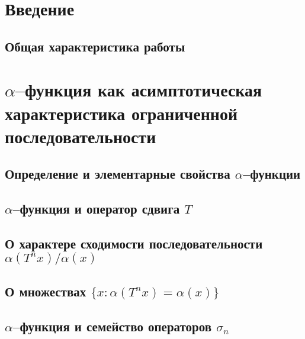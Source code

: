 \documentclass[12pt,a4paper,openbib]{report}
\theoremstyle{definition}
\begin{document}

\setcounter{page}{2}
\tableofcontents

\chapter*{Введение}

\section*{Общая характеристика работы}





\chapter{$\alpha$--функция как асимптотическая характеристика ограниченной последовательности}

	\section{Определение и элементарные свойства $\alpha$--функции}
	

	\section{$\alpha$--функция и оператор сдвига $T$}
	

	\section{О характере сходимости последовательности $\alpha(T^n x)/ \alpha(x)$}
	

	\section{О множествах $\{x: \alpha(T^n x) = \alpha(x)\}$}
	

	\section{$\alpha$--функция и семейство операторов $\sigma_n$}
	
\end{document}
